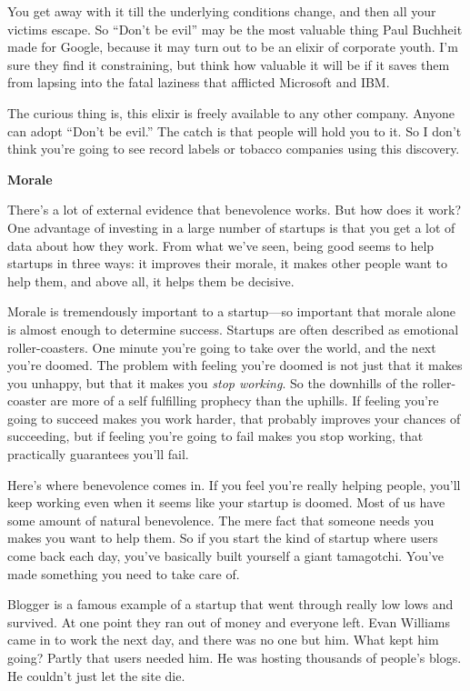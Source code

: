 \documentclass[12pt]{book}
\begin{document}
You get away with it till the underlying conditions change, and then all
your victims escape. So ``Don't be evil'' may be the most valuable thing
Paul Buchheit made for Google, because it may turn out to be an elixir
of corporate youth. I'm sure they find it constraining, but think how
valuable it will be if it saves them from lapsing into the fatal
laziness that afflicted Microsoft and IBM.

The curious thing is, this elixir is freely available to any other
company. Anyone can adopt ``Don't be evil.'' The catch is that people
will hold you to it. So I don't think you're going to see record labels
or tobacco companies using this discovery.

\textbf{Morale}

There's a lot of external evidence that benevolence works. But how does
it work? One advantage of investing in a large number of startups is
that you get a lot of data about how they work. From what we've seen,
being good seems to help startups in three ways: it improves their
morale, it makes other people want to help them, and above all, it helps
them be decisive.

Morale is tremendously important to a startup---so important that morale
alone is almost enough to determine success. Startups are often
described as emotional roller-coasters. One minute you're going to take
over the world, and the next you're doomed. The problem with feeling
you're doomed is not just that it makes you unhappy, but that it makes
you \emph{stop working}. So the downhills of the roller-coaster are more
of a self fulfilling prophecy than the uphills. If feeling you're going
to succeed makes you work harder, that probably improves your chances of
succeeding, but if feeling you're going to fail makes you stop working,
that practically guarantees you'll fail.

Here's where benevolence comes in. If you feel you're really helping
people, you'll keep working even when it seems like your startup is
doomed. Most of us have some amount of natural benevolence. The mere
fact that someone needs you makes you want to help them. So if you start
the kind of startup where users come back each day, you've basically
built yourself a giant tamagotchi. You've made something you need to
take care of.

Blogger is a famous example of a startup that went through really low
lows and survived. At one point they ran out of money and everyone left.
Evan Williams came in to work the next day, and there was no one but
him. What kept him going? Partly that users needed him. He was hosting
thousands of people's blogs. He couldn't just let the site die.
\end{document}
